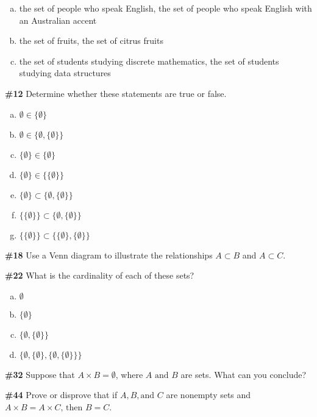 \documentclass{article}
\newcommand{\problem}[1]{\textbf{\##1}}
\newcommand{\prob}[1]{\problem{#1}}
\begin{document}
\begin{enumerate}[a)]
    \item the set of people who speak English, the set of people who speak English with an Australian accent
    \item the set of fruits, the set of citrus fruits
    \item the set of students studying discrete mathematics, the set of students studying data structures
\end{enumerate}
\pagebreak
\prob{12} Determine whether these statements are true or false.
\begin{enumerate}[a)]
    \item \(\emptyset \in \{\emptyset\}\)
    \item \(\emptyset \in \{\emptyset, \{\emptyset\}\}\)
    \item \(\{\emptyset\} \in \{\emptyset\}\)
    \item \(\{\emptyset\} \in \{\{\emptyset\}\}\)
    \item \(\{\emptyset\} \subset \{\emptyset, \{\emptyset\}\}\)
    \item \(\{\{\emptyset\}\} \subset \{\emptyset, \{\emptyset\}\}\)
    \item \(\{\{\emptyset\}\} \subset \{\{\emptyset\}, \{\emptyset\}\}\)
\end{enumerate}
\pagebreak
\prob{18}
Use a Venn diagram to illustrate the relationships \(A \subset B\) and \(A \subset C\).

\pagebreak
\prob{22}
What is the cardinality of each of these sets?
\begin{enumerate}[a)]
    \item \(\emptyset\)
    \item \(\{\emptyset\}\)
    \item \(\{\emptyset, \{\emptyset\}\}\)
    \item \(\{\emptyset, \{\emptyset\}, \{\emptyset, \{\emptyset\}\}\}\)
\end{enumerate}

\pagebreak
\prob{32} Suppose that \(A \times B = \emptyset\), where \(A \text{ and } B\) are sets. What can you conclude?

\pagebreak
\prob{44} Prove or disprove that if \(A, B, \text{and } C\) are nonempty sets and \(A \times B = A \times C\text{, then } B = C\).
\end{document}
